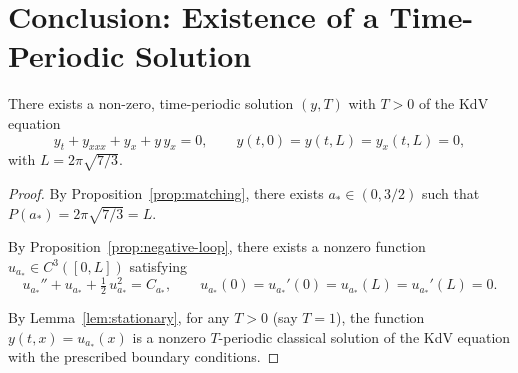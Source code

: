 \section{Conclusion: Existence of a Time-Periodic Solution}

\begin{theorem}\label{thm:main}
There exists a non-zero, time-periodic solution $(y, T)$ with $T > 0$ of the KdV equation
\[
y_t + y_{xxx} + y_x + y\,y_x = 0, \qquad y(t,0) = y(t,L) = y_x(t,L) = 0,
\]
with $L = 2\pi\sqrt{7/3}$.
\end{theorem}

\begin{proof}
By Proposition~\ref{prop:matching}, there exists $a_* \in (0, 3/2)$ such that $P(a_*) = 2\pi\sqrt{7/3} = L$.

By Proposition~\ref{prop:negative-loop}, there exists a nonzero function $u_{a_*} \in C^3([0, L])$ satisfying
\[
u_{a_*}'' + u_{a_*} + \tfrac{1}{2}\,u_{a_*}^2 = C_{a_*}, \qquad u_{a_*}(0) = u_{a_*}'(0) = u_{a_*}(L) = u_{a_*}'(L) = 0.
\]

By Lemma~\ref{lem:stationary}, for any $T > 0$ (say $T = 1$), the function $y(t,x) = u_{a_*}(x)$ is a nonzero $T$-periodic classical solution of the KdV equation with the prescribed boundary conditions.
\end{proof}

